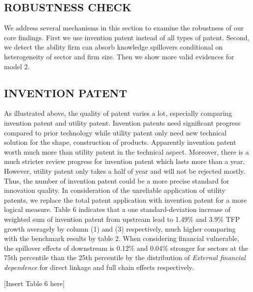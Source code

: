 \documentclass[12pt]{article}%
\begin{document}
\begin{CJK*}{GBK}{fs}
\section{ROBUSTNESS CHECK}
We address several mechanisms in this section to examine the robustness of our core findings. First we use invention patent instead of all types of patent. Second, we detect the ability firm can absorb knowledge spillovers conditional on heterogeneity of sector and firm size. Then we show more valid evidences for model 2.


\subsection{INVENTION PATENT}
As illustrated above, the quality of patent varies a lot, especially comparing invention patent and utility patent. Invention patents need significant progress compared to prior technology while utility patent only need new technical solution for the shape, construction of products. Apparently invention patent worth much more than utility patent in the technical aspect. Moreover, there is a much stricter review progress for invention patent which lasts more than a year. However, utility patent only takes a half of year and will not be rejected mostly. Thus, the number of invention patent could be a more precise standard for innovation quality. In consideration of the unreliable application of utility patents, we replace the total patent application with invention patent for a more logical measure. Table 6 indicates that a one standard-deviation increase of weighted sum of invention patent from upstream lead to 1.49\% and 3.9\% TFP growth averagely by column (1) and (3) respectively, much higher comparing with the benchmark results by table 2. When considering financial vulnerable, the spillover effects of downstream is 0.12\% and 0.04\% stronger for sectors at the 75th percentile than the 25th percentile by the distribution of \emph{External financial dependence} for direct linkage and full chain effects respectively.
\begin{center}
  [Insert Table 6 here]
\end{center}


\end{CJK*}
\end{document}
